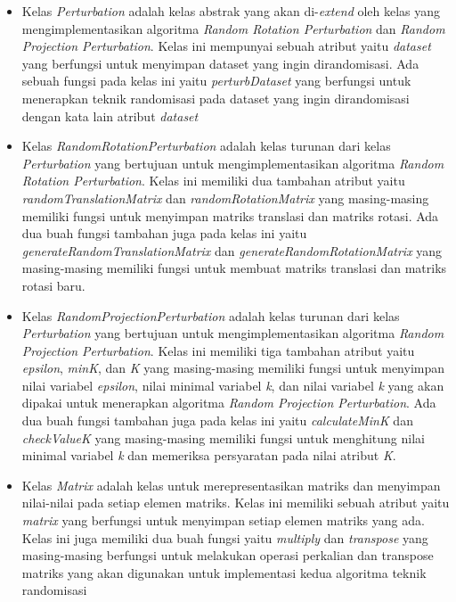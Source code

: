 \begin{itemize}
    \item Kelas \textit{Perturbation} adalah kelas abstrak yang akan di-\textit{extend} oleh kelas yang mengimplementasikan algoritma \textit{Random Rotation Perturbation} dan \textit{Random Projection Perturbation}. Kelas ini mempunyai sebuah atribut yaitu \textit{dataset} yang berfungsi untuk menyimpan dataset yang ingin dirandomisasi. Ada sebuah fungsi pada kelas ini yaitu \textit{perturbDataset} yang berfungsi untuk menerapkan teknik randomisasi pada dataset yang ingin dirandomisasi dengan kata lain atribut \textit{dataset}
    \item Kelas \textit{RandomRotationPerturbation} adalah kelas turunan dari kelas \textit{Perturbation} yang bertujuan untuk mengimplementasikan algoritma \textit{Random Rotation Perturbation}. Kelas ini memiliki dua tambahan atribut yaitu \textit{randomTranslationMatrix} dan \textit{randomRotationMatrix} yang masing-masing memiliki fungsi untuk menyimpan matriks translasi dan matriks rotasi. Ada dua buah fungsi tambahan juga pada kelas ini yaitu \textit{generateRandomTranslationMatrix} dan \textit{generateRandomRotationMatrix} yang masing-masing memiliki fungsi untuk membuat matriks translasi dan matriks rotasi baru.
    \item Kelas \textit{RandomProjectionPerturbation} adalah kelas turunan dari kelas \textit{Perturbation} yang bertujuan untuk mengimplementasikan algoritma \textit{Random Projection Perturbation}. Kelas ini memiliki tiga tambahan atribut yaitu \textit{epsilon}, \textit{minK}, dan \textit{K} yang masing-masing memiliki fungsi untuk menyimpan nilai variabel \textit{epsilon}, nilai minimal variabel \textit{k}, dan nilai variabel \textit{k} yang akan dipakai untuk menerapkan algoritma \textit{Random Projection Perturbation}. Ada dua buah fungsi tambahan juga pada kelas ini yaitu \textit{calculateMinK} dan \textit{checkValueK} yang masing-masing memiliki fungsi untuk menghitung nilai minimal variabel \textit{k} dan memeriksa persyaratan pada nilai atribut \textit{K}.
    \item Kelas \textit{Matrix} adalah kelas untuk merepresentasikan matriks dan menyimpan nilai-nilai pada setiap elemen matriks. Kelas ini memiliki sebuah atribut yaitu \textit{matrix} yang berfungsi untuk menyimpan setiap elemen matriks yang ada. Kelas ini juga memiliki dua buah fungsi yaitu \textit{multiply} dan \textit{transpose} yang masing-masing berfungsi untuk melakukan operasi perkalian dan transpose matriks yang akan digunakan untuk implementasi kedua algoritma teknik randomisasi

\end{itemize}
